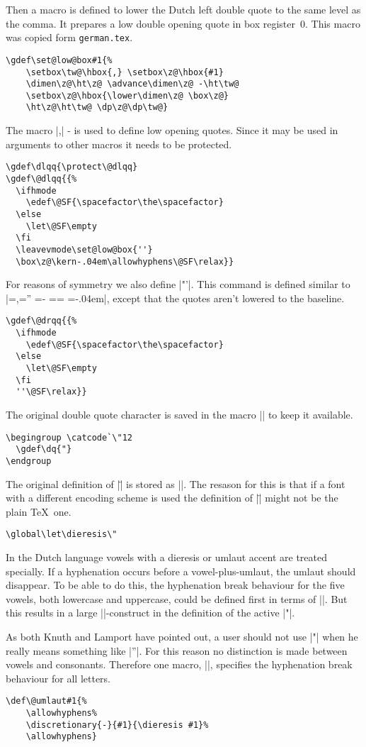 \documentclass{ltugboat}
\makeatletter
\newcommand{\file}[1]{\texttt{#1}}
\gdef\dlqq{{\setbox\tw@=\hbox{,}\setbox\z@=\hbox{''}%
  \dimen\z@=\ht\z@ \advance\dimen\z@-\ht\tw@
  \setbox\z@=\hbox{\lower\dimen\z@\box\z@}\ht\z@=\ht\tw@
  \dp\z@=\dp\tw@ \box\z@\kern-.04em}}
\def\allowhyphens{\penalty\@M \hskip\z@skip}
\def\set@low@box#1{\setbox\tw@\hbox{,}\setbox\z@\hbox{#1}\dimen\z@\ht\z@
     \advance\dimen\z@ -\ht\tw@
     \setbox\z@\hbox{\lower\dimen\z@ \box\z@}\ht\z@\ht\tw@ \dp\z@\dp\tw@ }
\makeatother
\begin{document}
Then a macro is defined to lower the Dutch left double quote to the
same level as the comma. It prepares a low double opening quote in box
register~0.  This macro was copied form \file{german.tex}.
\begin{verbatim}
\gdef\set@low@box#1{%
    \setbox\tw@\hbox{,} \setbox\z@\hbox{#1}
    \dimen\z@\ht\z@ \advance\dimen\z@ -\ht\tw@
    \setbox\z@\hbox{\lower\dimen\z@ \box\z@}
    \ht\z@\ht\tw@ \dp\z@\dp\tw@}
\end{verbatim}
The macro |\set@low@box| is used to define low opening quotes.  Since
it may be used in arguments to other macros it needs to be protected.
\begin{verbatim}
\gdef\dlqq{\protect\@dlqq}
\gdef\@dlqq{{%
  \ifhmode
    \edef\@SF{\spacefactor\the\spacefactor}
  \else
    \let\@SF\empty
  \fi
  \leavevmode\set@low@box{''}
  \box\z@\kern-.04em\allowhyphens\@SF\relax}}
\end{verbatim}
For reasons of symmetry we also define |"'|. This command is defined
similar to |\dlqq|, except that the quotes aren't lowered to the
baseline.
\begin{verbatim}
\gdef\@drqq{{%
  \ifhmode
    \edef\@SF{\spacefactor\the\spacefactor}
  \else
    \let\@SF\empty
  \fi
  ''\@SF\relax}}
\end{verbatim}
The original double quote character is saved in the macro |\dq| to
keep it available.
\begin{verbatim}
\begingroup \catcode`\"12
  \gdef\dq{"}
\endgroup
\end{verbatim}
The original definition of |\"| is stored as |\dieresis|. The resason
for this is that if a font with a different encoding scheme is used
the definition of |\"| might not be the plain \TeX\ one.
\begin{verbatim}
\global\let\dieresis\"
\end{verbatim}

In the Dutch language vowels with a dieresis or umlaut accent are
treated specially. If a hyphenation occurs before a vowel-plus-umlaut,
the umlaut should disappear. To be able to do this, the hyphenation
break behaviour for the five vowels, both lowercase and uppercase,
could be defined first in terms of |\discretionary|. But this results
in a large |\if|-construct in the definition of the active |"|.

As both Knuth and Lamport have pointed out, a user should not use |"|
when he really means something like |''|. For this reason no
distinction is made between vowels and consonants. Therefore one
macro, |\@umlaut|, specifies the hyphenation break behaviour for all
letters.
\begin{verbatim}
\def\@umlaut#1{%
    \allowhyphens%
    \discretionary{-}{#1}{\dieresis #1}%
    \allowhyphens}
\end{verbatim}
\end{document}
